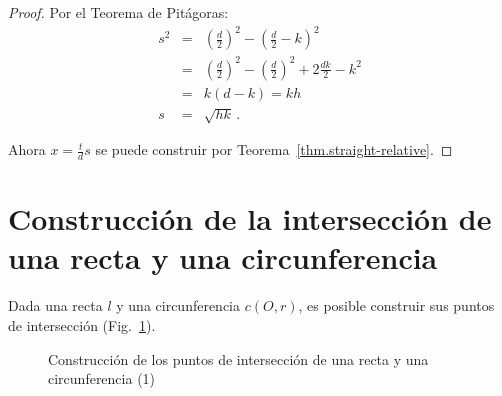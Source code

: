 \begin{proof}
Por el Teorema de Pitágoras:
\begin{eqnarray*}
s^2&=& \left(\frac{d}{2}\right)^2 - \left(\frac{d}{2}-k\right)^2\\
&=& \left(\frac{d}{2}\right)^2 - \left(\frac{d}{2}\right)^2 + 2\frac{dk}{2} - k^2\\
&=& k(d-k) = kh\\
s&=&\sqrt{hk}\,.
\end{eqnarray*}

Ahora $x=\displaystyle\frac{t}{d}s$ se puede construir por Teorema~\ref{thm.straight-relative}.
\end{proof}

\section{Construcción de la intersección de una recta y una circunferencia}\label{s.line-circle-straight}

\begin{theorem}
Dada una recta $l$ y una circunferencia $c(O,r)$, es posible construir sus puntos de intersección (Fig.~\ref{f.se-line-circle1}).
\end{theorem}
\begin{figure}[t]
\begin{center}
\end{center}
\caption{Construcción de los puntos de intersección de una recta y una circunferencia (1)}\label{f.se-line-circle1}
\end{figure}

